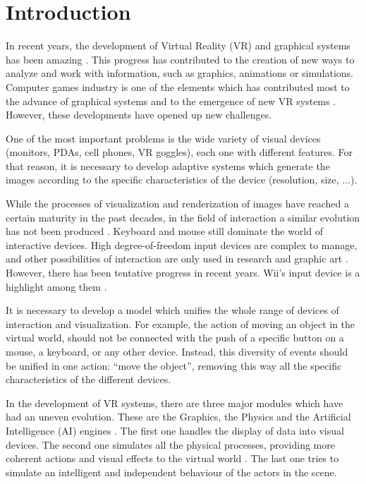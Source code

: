 \documentclass[twocolumn]{svjour3}
\begin{document}
\section{Introduction
\label{sec:introduction}}

In recent years, the development of Virtual Reality (VR) and graphical systems has been amazing \cite{Sherman2003}.
This progress has contributed to the creation of new ways to analyze and work with information, such
as graphics, animations or simulations. Computer games industry is one of the elements which has
contributed most to the advance of graphical systems and to the emergence of new VR systems \cite{Novak2007}.
However, these developments have opened up new challenges.

One of the most important problems is the wide variety of visual devices (monitors, PDAs, cell
phones, VR goggles), each one with different features. For that reason, it is necessary to develop
adaptive systems which generate the images according to the specific characteristics of the device
(resolution, size, ...).

While the processes of visualization and renderization of images have reached a certain maturity in
the past decades, in the field of interaction a similar evolution has not been produced
\cite{Joshua2004,David2005}. Keyboard and mouse still dominate the world of interactive devices.
High degree-of-freedom input devices are complex to manage, and other possibilities of interaction
are only used in research and graphic art \cite{Joshua2004}. However, there has been tentative
progress in recent years. Wii's input device is a highlight among them \cite{wiiNintendo}.

It is necessary to develop a model which unifies the whole range of devices of interaction and
visualization. For example, the action of moving an object in the virtual world, should not be
connected with the push of a specific button on a mouse, a keyboard, or any other device. Instead,
this diversity of events should be unified in one action: ``move the object'', removing this way
all the specific characteristics of the different devices.

In the development of VR systems, there are three major modules which have had an uneven evolution.
These are the Graphics, the Physics and the Artificial Intelligence (AI) engines \cite{Burdea2003}.
The first one handles the display of data into visual devices. The second one simulates all the
physical processes, providing more coherent actions and visual effects to the virtual world \cite{Wikipedia2007}.
The last one tries to simulate an intelligent and independent behaviour of the actors in the scene.
\end{document}
